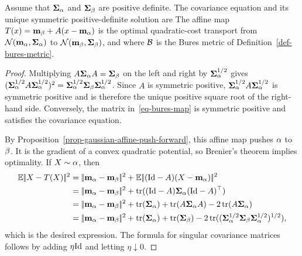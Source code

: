 \begin{prop}\label{prop-gaussian-w2-bures}
	Assume that $\mathbf{\Sigma}_\alpha$ and $\mathbf{\Sigma}_\beta$ are positive definite. The covariance equation and its unique symmetric positive-definite solution are
	The affine map $T(x)=\mathbf{m}_\beta+A(x-\mathbf{m}_\alpha)$ is the optimal quadratic-cost transport from $\mathcal{N}(\mathbf{m}_\alpha,\mathbf{\Sigma}_\alpha)$ to $\mathcal{N}(\mathbf{m}_\beta,\mathbf{\Sigma}_\beta)$, and
	where $\mathcal{B}$ is the Bures metric of Definition~\ref{def-bures-metric}.
\end{prop}
\begin{proof}
	Multiplying $A\mathbf{\Sigma}_\alpha A=\mathbf{\Sigma}_\beta$ on the left and right by $\mathbf{\Sigma}_\alpha^{1/2}$ gives
	$(\mathbf{\Sigma}_\alpha^{1/2}A\mathbf{\Sigma}_\alpha^{1/2})^2
	=\mathbf{\Sigma}_\alpha^{1/2}\mathbf{\Sigma}_\beta\mathbf{\Sigma}_\alpha^{1/2}$.
	Since $A$ is symmetric positive, $\mathbf{\Sigma}_\alpha^{1/2}A\mathbf{\Sigma}_\alpha^{1/2}$ is symmetric positive and is therefore the unique positive square root of the right-hand side. Conversely, the matrix in~\eqref{eq-bures-map} is symmetric positive and satisfies the covariance equation.

	By Proposition~\ref{prop-gaussian-affine-push-forward}, this affine map pushes $\alpha$ to $\beta$. It is the gradient of a convex quadratic potential, so Brenier's theorem implies optimality. If $X\sim\alpha$, then
	\begin{align*}
		\EE\norm{X-\T(X)}^2
		&=
		\norm{\mean_\al-\mean_\be}^2
		+
		\EE\norm{(\Id-A)(X-\mean_\al)}^2 \\
		&=
		\norm{\mean_\al-\mean_\be}^2
		+
		\tr((\Id-A)\cov_\al(\Id-A)^\top) \\
		&=
		\norm{\mean_\al-\mean_\be}^2
		+
		\tr(\cov_\al)+\tr(A\cov_\al A)-2\tr(A\cov_\al) \\
		&=
		\norm{\mean_\al-\mean_\be}^2
		+
		\tr(\cov_\al)+\tr(\cov_\be)
		-2\tr((\cov_\al^{1/2}\cov_\be\cov_\al^{1/2})^{1/2}),
	\end{align*}
	which is the desired expression. The formula for singular covariance matrices follows by adding $\eta\mathrm{Id}$ and letting $\eta\downarrow0$.
\end{proof}

